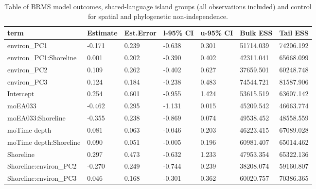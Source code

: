 \begin{table}[ht]
\centering
\begin{tabular}{p{5cm}p{2cm}p{2cm}p{2cm}p{2cm}p{2cm}p{2cm}}
  \toprule
term & Estimate & Est.Error & l-95\% CI & u-95\% CI & Bulk ESS & Tail ESS \\ 
  \midrule
environ\_PC1 & -0.171 & 0.239 & -0.638 & 0.301 & 51714.039 & 74206.192 \\ 
  environ\_PC1:Shoreline & 0.001 & 0.202 & -0.390 & 0.402 & 42311.041 & 65668.099 \\ 
  environ\_PC2 & 0.109 & 0.262 & -0.402 & 0.627 & 37659.501 & 60248.748 \\ 
  environ\_PC3 & 0.124 & 0.184 & -0.238 & 0.483 & 74544.721 & 81587.906 \\ 
  Intercept & 0.254 & 0.601 & -0.955 & 1.424 & 53615.519 & 63607.142 \\ 
  moEA033 & -0.462 & 0.295 & -1.131 & 0.015 & 45209.542 & 46663.774 \\ 
  moEA033:Shoreline & -0.355 & 0.238 & -0.869 & 0.074 & 49538.452 & 48558.559 \\ 
  moTime depth & 0.081 & 0.063 & -0.046 & 0.203 & 46223.415 & 67089.028 \\ 
  moTime depth:Shoreline & 0.090 & 0.051 & -0.005 & 0.196 & 60981.407 & 65014.462 \\ 
  Shoreline & 0.297 & 0.473 & -0.632 & 1.233 & 47953.354 & 65322.136 \\ 
  Shoreline:environ\_PC2 & -0.270 & 0.249 & -0.744 & 0.239 & 38208.074 & 59160.807 \\ 
  Shoreline:environ\_PC3 & 0.046 & 0.168 & -0.301 & 0.362 & 60020.757 & 70386.365 \\ 
   \bottomrule
\end{tabular}
\caption{Table of BRMS model outcomes, shared-language island groups (all observations included) and control for spatial and phylogenetic non-independence.} 
\label{BRMS_effects_medium_control_sp}
\end{table}
